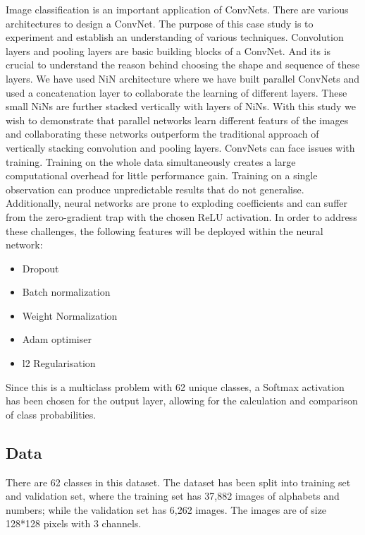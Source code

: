 \documentclass[fleqn,10pt]{SelfArx} %
\begin{document}
Image classification is an important application of ConvNets. There are various architectures to design a ConvNet. The purpose of this case study is to experiment and establish an understanding of various techniques. Convolution layers and pooling layers are basic building blocks of a ConvNet. And its is crucial to understand the reason behind choosing the shape and sequence of these layers.
\newline
We have used NiN architecture where we have built parallel ConvNets and used a concatenation layer to collaborate the learning of different layers. These small NiNs are further stacked vertically with layers of NiNs. With this study we wish to demonstrate that parallel networks learn different featurs of the images and collaborating these networks outperform the traditional approach of vertically stacking convolution and pooling layers.
\newline
ConvNets can face issues with training. Training on the whole data simultaneously creates a large computational overhead for little performance gain. Training on a single observation can produce unpredictable results that do not generalise. Additionally, neural networks are prone to exploding coefficients and can suffer from the zero-gradient trap with the chosen ReLU activation. In order to address these challenges, the following features will be deployed within the neural network:
\begin{itemize}
\itemsep0em
  \item Dropout
  \item Batch normalization
  \item Weight Normalization
  \item Adam optimiser
  \item l2 Regularisation
\end{itemize}
Since this is a multiclass problem with 62 unique classes, a Softmax activation has been chosen for the output layer, allowing for the calculation and comparison of class probabilities.

\subsection{Data}
There are 62 classes in this dataset. The dataset has been split into training set and validation set, where the training set has 37,882 images of alphabets and numbers; while the validation set has 6,262 images. The images are of size 128*128 pixels with 3 channels.
\end{document}
